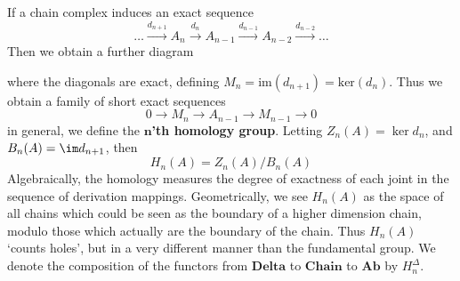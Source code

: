 If a chain complex induces an exact sequence
%
\[ \dots \xrightarrow{d_{n+1}} A_n \xrightarrow{d_n} A_{n-1} \xrightarrow{d_{n-1}} A_{n-2} \xrightarrow{d_{n-2}} \dots \]
%
Then we obtain a further diagram
%
\begin{center}
\end{center}
%
where the diagonals are exact, defining $M_n = \text{im}(d_{n+1}) = \text{ker}(d_n)$. Thus we obtain a family of short exact sequences
%
\[ 0 \to M_n \to A_{n-1} \to M_{n-1} \to 0 \]
%
in general, we define the {\bf $\mathbf{n}$'th homology group}. Letting $Z_n(A) = \ker d_n$, and $B_n(A) = \im d_{n+1}$, then
%
\[ H_n(A) = Z_n(A)/B_n(A) \]
%
Algebraically, the homology measures the degree of exactness of each joint in the sequence of derivation mappings. Geometrically, we see $H_n(A)$ as the space of all chains which could be seen as the boundary of a higher dimension chain, modulo those which actually are the boundary of the chain. Thus $H_n(A)$ `counts holes', but in a very different manner than the fundamental group. We denote the composition of the functors from $\textbf{Delta}$ to $\textbf{Chain}$ to $\textbf{Ab}$ by $H_n^\Delta$.

